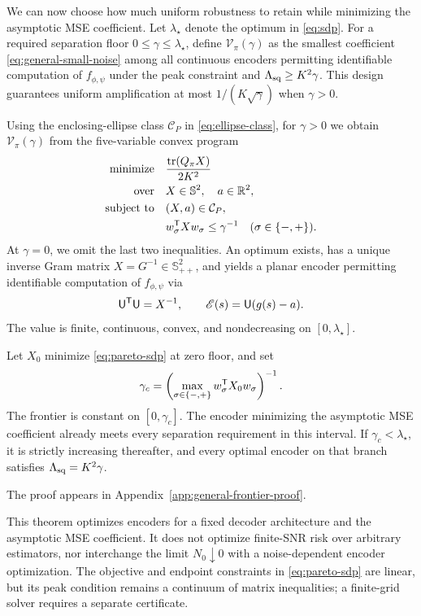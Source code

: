 We can now choose how much uniform robustness to retain while minimizing the asymptotic MSE coefficient. Let $\lambda_\star$ denote the optimum in \eqref{eq:sdp}. For a required separation floor $0\le\gamma\le\lambda_\star$, define $\mathcal V_\pi(\gamma)$ as the smallest coefficient \eqref{eq:general-small-noise} among all continuous encoders permitting identifiable computation of $f_{\phi,\psi}$ under the peak constraint and $\Lambda_{\mathrm{sq}}\ge K^2\gamma$. This design guarantees uniform amplification at most $1/(K\sqrt\gamma)$ when $\gamma>0$.

\begin{theorem}\label{thm:pareto}
Using the enclosing-ellipse class $\mathcal C_P$ in \eqref{eq:ellipse-class}, for $\gamma>0$ we obtain $\mathcal V_\pi(\gamma)$ from the five-variable convex program
\begin{equation}
\begin{aligned}
 \text{minimize}\quad &\frac{\operatorname{tr}(Q_\pi X)}{2K^2}\\
 \text{over}\quad &X\in\mathbb S^2,\quad a\in\mathbb R^2,\\
 \text{subject to}\quad
 &(X,a)\in\mathcal C_P,\\
 &w_\sigma^\mathsf T Xw_\sigma\le\gamma^{-1}
       \quad(\sigma\in\{-,+\}).
\end{aligned}
 \label{eq:pareto-sdp}
\end{equation}
At $\gamma=0$, we omit the last two inequalities. An optimum exists, has a unique inverse Gram matrix $X=G^{-1}\in\mathbb S_{++}^2$, and yields a planar encoder permitting identifiable computation of $f_{\phi,\psi}$ via
$$
 \mathsf U^\mathsf T\mathsf U=X^{-1},\qquad
 \mathscr E(s)=\mathsf U(g(s)-a).
$$
The value is finite, continuous, convex, and nondecreasing on $[0,\lambda_\star]$.

Let $X_0$ minimize \eqref{eq:pareto-sdp} at zero floor, and set
$$
 \gamma_c=\left(\max_{\sigma\in\{-,+\}}
 w_\sigma^\mathsf T X_0w_\sigma\right)^{-1}.
$$
The frontier is constant on $[0,\gamma_c]$. The encoder minimizing the asymptotic MSE coefficient already meets every separation requirement in this interval. If $\gamma_c<\lambda_\star$, it is strictly increasing thereafter, and every optimal encoder on that branch satisfies $\Lambda_{\mathrm{sq}}=K^2\gamma$.
\end{theorem}
The proof appears in Appendix~\ref{app:general-frontier-proof}.

This theorem optimizes encoders for a fixed decoder architecture and the asymptotic MSE coefficient. It does not optimize finite-SNR risk over arbitrary estimators, nor interchange the limit $N_0\downarrow0$ with a noise-dependent encoder optimization. The objective and endpoint constraints in \eqref{eq:pareto-sdp} are linear, but its peak condition remains a continuum of matrix inequalities; a finite-grid solver requires a separate certificate.

